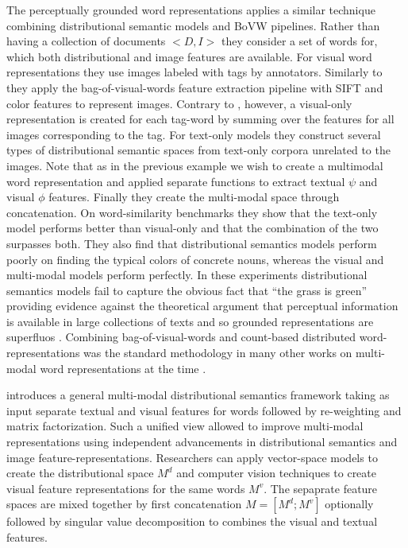 The perceptually grounded word representations \cite{bruni2012distributional} applies
a similar technique combining distributional semantic models and BoVW pipelines.
Rather than having a collection of documents $<D, I>$ they consider a set of words for, which
both distributional and image features are available. For visual word representations
they use images labeled with tags by annotators. Similarly to \cite{feng2010visual} they
apply the bag-of-visual-words feature extraction pipeline with SIFT and color features to
represent images. Contrary to \cite{feng2010visual}, however, a visual-only representation is
created for each tag-word by summing over the features for all images corresponding to the tag.
For text-only models they construct several types of distributional semantic spaces from text-only
corpora unrelated to the images. Note that as in the previous example we wish to create a multimodal
word representation and applied separate functions to extract textual $\psi$ and visual
$\phi$ features. Finally they create the multi-modal space through concatenation.
On word-similarity benchmarks they show that the text-only model performs better than visual-only
and that the combination of the two surpasses both. They also find that distributional semantics
models perform poorly on finding the typical colors of concrete nouns,
whereas the visual and multi-modal models perform perfectly. In these experiments
distributional semantics models fail to capture the obvious fact that ``the grass is green''
providing evidence against the theoretical argument that perceptual information is available in
large collections of texts and so grounded representations are superfluos \cite{louwerse2011symbol}.
Combining bag-of-visual-words and count-based distributed word-representations was the standard methodology
in many other works on multi-modal word representations at the time
\cite{bruni2011distributional,leong2011going,leong2011measuring}.

\cite{bruni2014multimodal} introduces a general multi-modal distributional semantics framework taking as input
separate textual and visual features for words followed by re-weighting and matrix factorization.
Such a unified view allowed to improve multi-modal representations using independent advancements
in distributional semantics and image feature-representations. Researchers can apply vector-space
models to create the distributional space $M^d$ and computer vision techniques to create
visual feature representations for the same words $M^v$. The sepaprate feature spaces
are mixed together by first concatenation $M = [M^d;M^v]$ optionally followed by singular value decomposition
to combines the visual and textual features.

